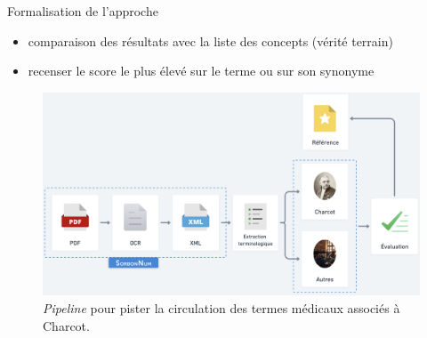 \begin{frame}{Formalisation de l'approche}
	\begin{itemize}
		\item comparaison des résultats avec la liste des concepts (vérité terrain)
		\item recenser le score le plus élevé sur le terme ou sur son synonyme
	\end{itemize}
	\begin{figure}[h]
		\includegraphics[width=\linewidth]{pic/formalisation_approche.png}
		\caption{\textit{Pipeline} pour pister la circulation des termes médicaux associés à Charcot.}
		\label{fig:ling_out_TAL}
	\end{figure}
\end{frame}

